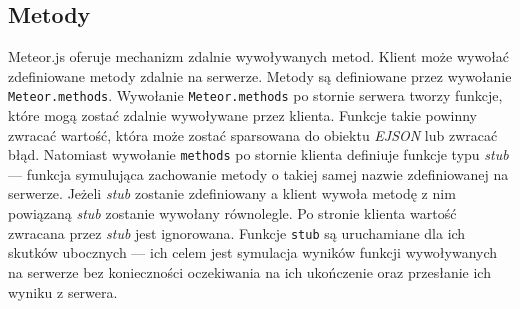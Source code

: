 \subsection{Metody}
Meteor.js oferuje mechanizm zdalnie wywoływanych metod. Klient może wywołać zdefiniowane metody zdalnie na serwerze. Metody są definiowane przez wywołanie \verb|Meteor.methods|. Wywołanie \verb|Meteor.methods| po stornie serwera tworzy funkcje, które mogą zostać zdalnie wywoływane przez klienta. Funkcje takie powinny zwracać wartość, która może zostać sparsowana do obiektu \textit{EJSON} lub zwracać błąd. Natomiast wywołanie \verb|methods| po stornie klienta definiuje funkcje typu \textit{stub} --- funkcja symulująca zachowanie metody o takiej samej nazwie  zdefiniowanej na serwerze. Jeżeli \textit{stub} zostanie zdefiniowany a klient wywoła metodę z nim powiązaną \textit{stub} zostanie wywołany równolegle. Po stronie klienta wartość zwracana przez \textit{stub} jest ignorowana. Funkcje \verb|stub| są uruchamiane dla ich skutków ubocznych --- ich celem jest symulacja wyników funkcji wywoływanych na serwerze bez konieczności oczekiwania na ich ukończenie oraz przesłanie ich wyniku z serwera.

